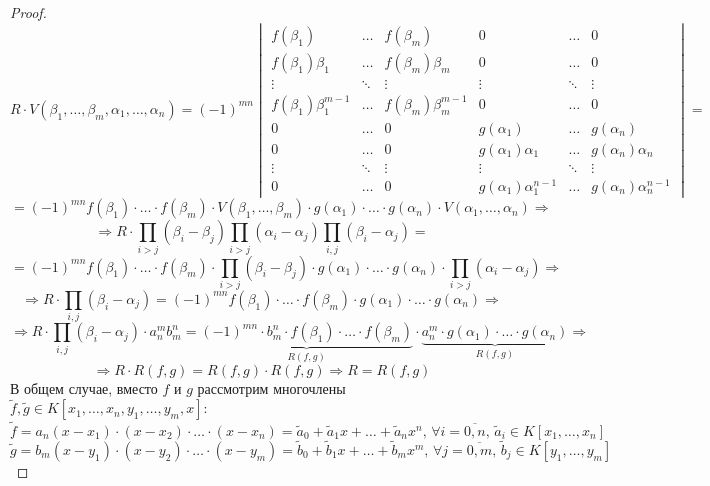 \documentclass[12pt]{article}
\theoremstyle{definition}
\newcommand{\wte}[1]{\widetilde{#1}}
\newcommand{\ovl}[1]{\overline{#1}}
\begin{document}
\begin{proof}
	$$
		R{\cdot}V(\beta_1,\dotsc,\beta_m,\alpha_1,\dotsc,\alpha_n) = 
		(-1)^{mn} 
		\begin{vmatrix}
			f(\beta_1) & \dotsc & f(\beta_m) & 0 & \dotsc &0\\
			f(\beta_1)\beta_1 & \dotsc & f(\beta_m)\beta_m & 0 & \dotsc & 0\\
			\vdots & \ddots & \vdots & \vdots  & \ddots  & \vdots \\
			f(\beta_1)\beta_1^{m - 1} & \dotsc & f(\beta_m)\beta_m^{m - 1} & 0 & \dotsc & 0\\
			0 & \dotsc & 0 & g(\alpha_1) & \dotsc & g(\alpha_n)\\
			0 & \dotsc & 0 & g(\alpha_1)\alpha_1 & \dotsc & g(\alpha_n)\alpha_n\\
			\vdots & \ddots & \vdots & \vdots  & \ddots  & \vdots \\
			0 & \dotsc & 0 & g(\alpha_1)\alpha_1^{n - 1} & \dotsc & g(\alpha_n)\alpha_n^{n - 1}
		\end{vmatrix} =
	$$
	$$
		= (-1)^{mn} f(\beta_1){\cdot}\dotsc{\cdot}f(\beta_m){\cdot}V(\beta_1,\dotsc,\beta_m){\cdot}g(\alpha_1){\cdot}\dotsc{\cdot}g(\alpha_n){\cdot}V(\alpha_1,\dotsc,\alpha_n) \Rightarrow
	$$
	$$
		\Rightarrow R{\cdot}\prod\limits_{i > j}(\beta_i - \beta_j)\prod\limits_{i > j}(\alpha_i - \alpha_j)\prod\limits_{i, j}(\beta_i - \alpha_j) = 
	$$
	$$
		= (-1)^{mn} f(\beta_1){\cdot}\dotsc{\cdot}f(\beta_m){\cdot}\prod\limits_{i > j}(\beta_i - \beta_j){\cdot}g(\alpha_1){\cdot}\dotsc{\cdot}g(\alpha_n){\cdot}\prod\limits_{i > j}(\alpha_i - \alpha_j) \Rightarrow
	$$
	$$
		\Rightarrow R{\cdot}\prod\limits_{i, j}(\beta_i - \alpha_j) = (-1)^{mn}f(\beta_1){\cdot}\dotsc{\cdot}f(\beta_m){\cdot}g(\alpha_1){\cdot}\dotsc{\cdot}g(\alpha_n) \Rightarrow
	$$
	$$
		\Rightarrow R{\cdot}\prod\limits_{i, j}(\beta_i - \alpha_j){\cdot}a_n^mb_m^n =   \underbrace{(-1)^{mn}{\cdot}b_m^n{\cdot}f(\beta_1){\cdot}\dotsc{\cdot}f(\beta_m)}_{R(f,g)}{\cdot}\underbrace{a_n^m{\cdot}g(\alpha_1){\cdot}\dotsc{\cdot}g(\alpha_n)}_{R(f,g)}\Rightarrow
	$$
	$$
		\Rightarrow R{\cdot}R(f,g) = R(f,g){\cdot}R(f,g) \Rightarrow R = R(f,g)
	$$
	В общем случае, вместо $f$ и $g$ рассмотрим многочлены $\wte{f}, \wte{g} \in K[x_1,\dotsc,x_n,y_1,\dotsc,y_m,x]$:
	$$
		\wte{f} = a_n(x - x_1){\cdot}(x- x_2){\cdot}\dotsc{\cdot}(x - x_n) = \wte{a}_0 + \wte{a}_1x + \dotsc + \wte{a}_nx^n, \, \forall i =\ovl{0,n}, \, \wte{a}_i \in K[x_1,\dotsc,x_n]
	$$
	$$
		\wte{g} = b_m(x - y_1){\cdot}(x - y_2){\cdot}\dotsc{\cdot}(x - y_m) = \wte{b}_0 + \wte{b}_1x + \dotsc + \wte{b}_mx^m, \, \forall j =\ovl{0,m}, \,  \wte{b}_j \in K[y_1,\dotsc,y_m]
$$
\end{proof}
\end{document}
